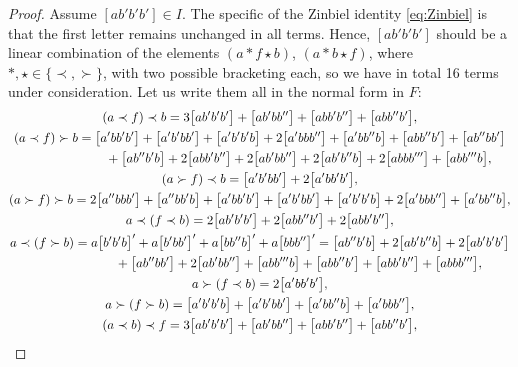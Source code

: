 \documentclass[pdftex]{sigma}
\numberwithin{equation}{section}
\begin{document}
\begin{proof}
Assume $[ab'b'b']\in I$.
The specific of the Zinbiel identity \eqref{eq:Zinbiel}
is that the first letter remains unchanged in all terms.
Hence, $[ab'b'b']$ should be a
linear combination of the elements
$(a\ast f\star b)$, $(a\ast b\star f)$,
where $\ast, \star \in \{\prec, \succ \}$,
with two possible bracketing each, so we have in total 16 terms
under consideration. Let us write them all in the normal form in $F$:
\begin{gather*}
(a\prec f)\prec b
 = 3\bigl[ab'b'b'\bigr]+\bigl[ab'bb''\bigr]+\bigl[abb'b''\bigr]+\bigl[abb''b'\bigr], \\
%
(a\prec f)\succ b
 =\bigl[a'bb'b'\bigr]+\bigl[a'b'bb'\bigr]+\bigl[a'b'b'b\bigr]+2\bigl[a'bbb''\bigr]+\bigl[a'bb''b\bigr]+\bigl[abb''b'\bigr]+\bigl[ab''bb'\bigr]\\
\hphantom{(a\prec f)\succ b=}{} +\bigl[ab''b'b\bigr]+2\bigl[abb'b''\bigr]+2\bigl[ab'bb''\bigr]+2\bigl[ab'b''b\bigr]+2\bigl[abbb'''\bigr]+\bigl[abb'''b\bigr], \\
%
(a\succ f)\prec b
 = \bigl[a'b'bb'\bigr]+2\bigl[a'bb'b'\bigr], \\
%
(a\succ f)\succ b
 = 2\bigl[a''bbb'\bigr]+\bigl[a''bb'b\bigr] +\bigl[a'bb'b'\bigr]+\bigl[a'b'bb'\bigr]+\bigl[a'b'b'b\bigr]+2\bigl[a'bbb''\bigr]+\bigl[a'bb''b\bigr], \\
%
a\prec (f\prec b)
 = 2\bigl[ab'b'b'\bigr]+2\bigl[abb''b'\bigr]+2\bigl[abb'b''\bigr], \\
%
a\prec (f\succ b)
 = a\bigl[b'b'b\bigr]'+a\bigl[b'bb'\bigr]' + a\bigl[bb''b\bigr]' + a\bigl[bbb''\bigr]'
 = \bigl[ab''b'b\bigr] + 2\bigl[ab'b''b\bigr]+ 2\bigl[ab'b'b'\bigr]\\
\hphantom{a\prec (f\succ b)=}{} + \bigl[ab''bb'\bigr]+2\bigl[ab'bb''\bigr] +\bigl[abb'''b\bigr]+\bigl[abb''b'\bigr]+\bigl[abb'b''\bigr]+\bigl[abbb'''\bigr], \\
%
a\succ (f\prec b)
 = 2\bigl[a'bb'b'\bigr], \\
%
a\succ (f\succ b)
 = \bigl[a'b'b'b\bigr]+\bigl[a'b'bb'\bigr]+\bigl[a'bb''b\bigr]+\bigl[a'bbb''\bigr], \\
%
(a\prec b)\prec f
 = 3\bigl[ab'b'b'\bigr] + \bigl[ab'bb''\bigr]+\bigl[abb'b''\bigr]+\bigl[abb''b'\bigr], \\

\end{gather*}
\end{proof}
\end{document}
